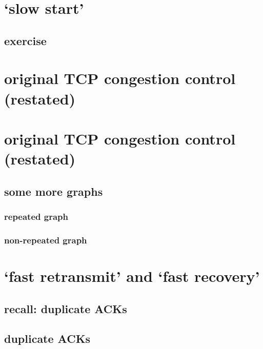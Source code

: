 
\section{`slow start'}

\subsection{exercise}



\section{original TCP congestion control (restated)}


\section{original TCP congestion control (restated)}


\subsection{some more graphs}
\subsubsection{repeated graph}

\subsubsection{non-repeated graph}


\section{`fast retransmit' and `fast recovery'}

\subsection{recall: duplicate ACKs}


\subsection{duplicate ACKs}


